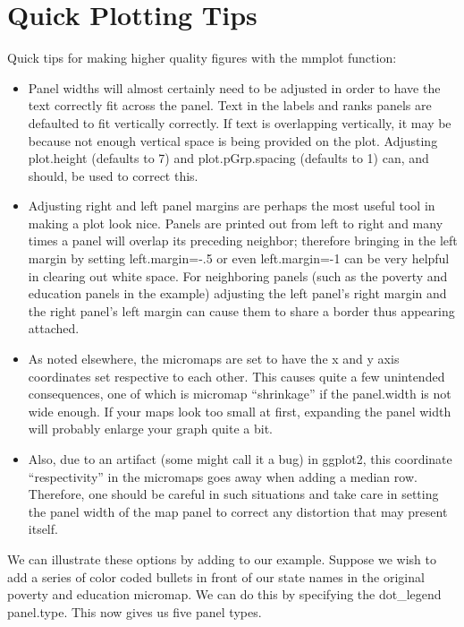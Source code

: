 \documentclass{article}
\begin{document}
\section{Quick Plotting Tips}
Quick tips for making higher quality figures with the mmplot function:
\begin{itemize}
\item Panel widths will almost certainly need to be adjusted in order to have the text correctly fit across the panel. Text in the labels and ranks panels are defaulted to fit vertically correctly. If text is overlapping vertically, it may be because not enough vertical space is being provided on the plot. Adjusting plot.height (defaults to 7) and plot.pGrp.spacing (defaults to 1) can, and should, be used to correct this.
\item Adjusting right and left panel margins are perhaps the most useful tool
in making a plot look nice. Panels are printed out from left to right and
many times a panel will overlap its preceding neighbor; therefore bringing
in the left margin by setting left.margin=-.5 or even left.margin=-1 can be very helpful in clearing out white space. For neighboring panels (such
as the poverty and education panels in the example) adjusting the left panel's
right margin and the right panel's left margin can cause them to share a
border thus appearing attached.
\item As noted elsewhere, the micromaps are set to have the x and y axis coordinates set respective to each other. This causes quite a few unintended consequences, one of which is micromap ``shrinkage'' if the
panel.width is not wide enough. If your maps look too small at first, expanding the panel width will probably enlarge your graph quite a bit.
\item Also, due to an artifact (some might call it a bug) in ggplot2, this coordinate ``respectivity'' in the micromaps goes away when adding a median row. Therefore, one should be careful in such situations and
take care in setting the panel width of the map panel to correct any distortion that may present itself.
\end{itemize}
We can illustrate these options by adding to our example. Suppose we wish to add a series of color coded bullets in front of our state names in the original poverty and education micromap. We can do this by specifying the dot\_legend panel.type.  This now gives us five panel types.
\end{document}
